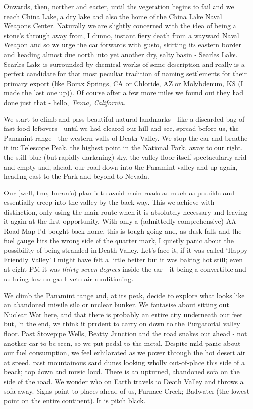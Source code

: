 \documentclass[a5paper,titlepage,11pt,draft]{book}
\begin{document}
Onwards, then, norther and easter, until the vegetation begins to fail and we reach China Lake, a dry lake and also the home of the China Lake Naval Weapons Center.  Naturally we are slightly concerned with the idea of being a stone's through away from, I dunno, instant fiery death from a wayward Naval Weapon and so we urge the car forwards with gusto, skirting its eastern border and heading almost due north into yet another dry, salty basin - Searles Lake.  Searles Lake is surrounded by chemical works of some description and really is a perfect candidate for that most peculiar tradition of naming settlements for their primary export (like Borax Springs, CA or Chloride, AZ or Molybdenum, KS (I made the last one up)).  Of course after a few more miles we found out they had done just that - hello, \emph{Trona, California}.

We start to climb and pass beautiful natural landmarks - like a discarded bag of fast-food leftovers - until we had cleared our hill and see, spread before us, the Panamint range - the western walls of Death Valley.  We stop the car and breathe it in: Telescope Peak, the highest point in the National Park, away to our right, the still-blue (but rapidly darkening) sky, the valley floor itself spectacularly arid and empty and, ahead, our road down into the Panamint valley and up again, heading east to the Park and beyond to Nevada.

Our (well, fine, Imran's) plan is to avoid main roads as much as possible and essentially creep into the valley by the back way.  This we achieve with distinction, only using the main route when it is absolutely necessary and leaving it again at the first opportunity.  With only a (admittedly comprehensive) AA Road Map I'd bought back home, this is tough going and, as dusk falls and the fuel gauge hits the wrong side of the quarter mark, I quietly panic about the possibility of being stranded in Death Valley.  Let's face it, if it was called `Happy Friendly Valley' I might have felt a little better but it was baking hot still; even at eight PM it was \emph{thirty-seven degrees} inside the car - it being a convertible and us being low on gas I veto air conditioning.

We climb the Panamint range and, at its peak, decide to explore what looks like an abandoned missile silo or nuclear bunker.  We fantasise about sitting out Nuclear War here, and that there is probably an entire city underneath our feet but, in the end, we think it prudent to carry on down to the Purgatorial valley floor.  Past Stovepipe Wells, Beatty Junction and the road snakes out ahead - not another car to be seen, so we put pedal to the metal.  Despite mild panic about our fuel consumption, we feel exhilarated as we power through the hot desert air at speed, past mountainous sand dunes looking wholly out-of-place this side of a beach; top down and music loud.  There is an upturned, abandoned sofa on the side of the road.  We wonder who on Earth travels to Death Valley and throws a sofa away.  Signs point to places ahead of us, Furnace Creek; Badwater (the lowest point on the entire continent).  It is pitch black.
\end{document}

